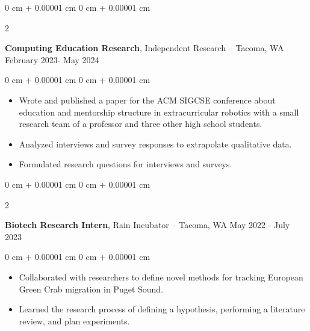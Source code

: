 \documentclass[10pt, article]{article}
\newenvironment{highlights}{
    \begin{itemize}[
        topsep=0.10 cm,
        parsep=0.10 cm,
        partopsep=0pt,
        itemsep=0pt,
        leftmargin=0 cm + 10pt
    ]
}{
    \end{itemize}
} %
\newenvironment{onecolentry}{
    \begin{adjustwidth}{
        0 cm + 0.00001 cm
    }{
        0 cm + 0.00001 cm
    }
}{
    \end{adjustwidth}
} %
\newenvironment{twocolentry}[2][]{
    \onecolentry
    \def\secondColumn{#2}
    \setcolumnwidth{\fill, 4.5 cm}
    \begin{paracol}{2}
}{
    \switchcolumn \raggedleft \secondColumn
    \end{paracol}
    \endonecolentry
} %
\begin{document}
        \vspace{0.2 cm}

        \begin{twocolentry}{
            February 2023- May 2024
        }
            \textbf{Computing Education Research}, Independent Research -- Tacoma, WA\end{twocolentry}

        \vspace{0.20 cm}
        \begin{onecolentry}
            \begin{highlights}
              \item Wrote and published a paper for the ACM SIGCSE conference about education and mentorship structure in extracurricular robotics with a small research team of a professor and three other high school students.
              \item Analyzed interviews and survey responses to extrapolate qualitative data.
              \item Formulated research questions for interviews and surveys.
            \end{highlights}
        \end{onecolentry}
        \vspace{0.2 cm}
        \begin{twocolentry}{ 
            May 2022 - July 2023

          }
        \textbf{Biotech Research Intern}, Rain Incubator -- Tacoma, WA\end{twocolentry}
        \vspace{0.2 cm}
        \begin{onecolentry}
          \begin{highlights}
          \item Collaborated with researchers to define novel methods for tracking European Green Crab migration in Puget Sound.
          \item Learned the research process of defining a hypothesis, performing a literature review, and plan experiments.

          \end{highlights}
        \end{onecolentry}
\end{document}
